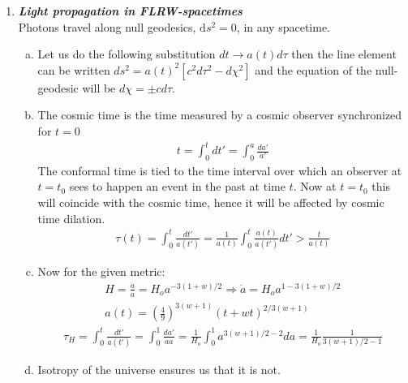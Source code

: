 \documentclass[a4paper,12pt]{article}
\newcommand{\question}[1]{\textbf{\textit{#1}}}
\newcommand{\dd}{\mathrm{d}}
\begin{document}
	\begin{enumerate}
		
		\item \question{Light propagation in FLRW-spacetimes}\\
		Photons travel along null geodesics, $\dd s^2=0$, in any spacetime. 
		\begin{enumerate}[(a)]
			\item Let us do the following substitution $dt
                          \rightarrow a(t)d\tau$ then the line element
                          can be written
                          $ds^2=a(t)^2[c^2d\tau^2-d\chi^2]$ and the
                          equation of the null-geodesic will be
                          $d\chi=\pm cd\tau$.
			\item The cosmic time is the time measured by
                          a cosmic observer synchronized for $t=0$ 
 \begin{align}
   t=\int_0^t dt' = \int_0^a\frac{da'}{\dot{a}'}
   \end{align}
The conformal time is tied to the time interval over which an observer
at $t=t_0$ sees to happen an event in the past at time $t$. Now at
$t=t_0$ this will coincide with the cosmic time, hence it will be
affected by cosmic time dilation.
                          \begin{align}
                            \tau(t)=\int_0^t \frac{dt'}{a(t')} = \frac{1}{a(t)}
                              \int_0^t \frac{a(t)}{a(t')} dt' > \frac{t}{a(t)}
                          \end{align}
			\item Now for the given metric:
                          \begin{align}
                            H=\frac{\dot{a}}{a}= H_o a^{-3(1+w)/2}
                            \Rightarrow \dot{a} = H_o
                            a^{1-3(1+w)/2}\\
                            a(t)=\left(\frac{4}{9}\right)^{3(w+1)}(t+wt)^{2/3(w+1)}
                            \end{align}
                          \begin{align}
                            \tau_H=\int_0^t \frac{dt'}{a(t')} =
                            \int_0^1 \frac{da'}{\dot{a}a} =
                            \frac{1}{H_o}\int_0^1 a^{3(w+1)/2 -2}da =  \frac{1}{H_o}\frac{1}{3(w+1)/2 -1}
                            \end{align}
			\item Isotropy of the universe ensures us that
                          it is not.
		\end{enumerate}
		

\end{enumerate}
\end{document}
